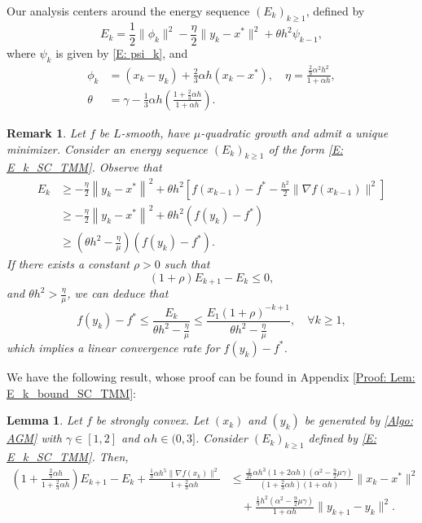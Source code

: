 \documentclass[pdflatex,sn-mathphys-num]{sn-jnl}
\theoremstyle{thmstyleone}
\newtheorem{lemma}[theorem]{Lemma}
\theoremstyle{thmstyletwo}
\newtheorem{remark}{Remark}
\theoremstyle{thmstylethree}
\begin{document}
Our analysis centers around the energy sequence $(E_k)_{k\ge 1}$, defined by
\begin{equation}\label{E: E_k_SC_TMM}
E_k = \frac{1}{2}\| \phi_k \|^2 - \frac{\eta}{2}\| y_k-x^* \|^2 + \theta h^2 \psi_{k-1},
\end{equation}
where $\psi_k$ is given by \eqref{E: psi_k}, and
\begin{align*}
\phi_k &= (x_k-y_k) + \frac{2}{3}\alpha h(x_k-x^*),
\quad \eta = \frac{\frac{2}{9}\alpha^2 h^2}{1 + \alpha h },\\
\theta &= \gamma  - \frac{1}{3}\alpha h\left( \frac{1 + \frac{2}{3}\alpha h}{1+\alpha h} \right).
\end{align*}

\begin{remark}\label{Rem: func_estimate_QG}
Let $f$ be $L$-smooth, have $\mu$-quadratic growth and admit a unique minimizer. Consider an energy sequence $(E_k)_{k\ge 1}$ of the form \eqref{E: E_k_SC_TMM}. Observe that
\begin{align*}
E_k &\ge - \frac{\eta}{2}\left\| y_k - x^* \right\|^2 + \theta h^2 \left[ f(x_{k-1}) - f^* - \frac{h^2}{2}\| \nabla f(x_{k-1}) \|^2 \right] \\
&\ge - \frac{\eta}{2}\left\| y_k - x^* \right\|^2 + \theta h^2 \left( f(y_k) - f^* \right)\\
&\ge \left( \theta h^2 - \frac{\eta}{\mu} \right) \left( f(y_k) - f^* \right).
\end{align*}
If there exists a constant $\rho > 0$ such that
\begin{equation}\nonumber
(1+\rho) E_{k+1} - E_k \le 0,
\end{equation}
and $\theta h^2 > \frac{\eta}{\mu}$, we can deduce that
\begin{equation}\nonumber
f(y_k) - f^* \le \frac{E_k}{\theta h^2 - \frac{\eta}{\mu}} \le \frac{E_1 (1+\rho)^{-k+1}}{\theta h^2 - \frac{\eta}{\mu} },\quad \forall k\ge 1,
\end{equation}
which implies a linear convergence rate for $f(y_k) - f^*$.
\end{remark}


We have the following result, whose proof can be found in Appendix \ref{Proof: Lem: E_k_bound_SC_TMM}:

\begin{lemma}\label{Lem: E_k_bound_SC_TMM}
Let $f$ be strongly convex. Let $(x_k)$ and $(y_k)$ be generated by \eqref{Algo: AGM} with $\gamma\in[1, 2]$ and $\alpha h\in(0,3]$. Consider $(E_k)_{k\ge 1}$ defined by \eqref{E: E_k_SC_TMM}. Then, 
\begin{align*}
\left( 1 + \frac{\frac{2}{3}\alpha h}{1 + \frac{2}{3}\alpha h} \right) E_{k+1} - E_k
  + \frac{ \frac{1}{3}\alpha h^5 \| \nabla f(x_k) \|^2 }{ 1 + \frac{2}{3}\alpha h }
&\le \frac{\frac{2}{27}\alpha h^3 (1+2\alpha h) \left(\alpha^2 - \frac{9}{2}\mu\gamma \right)}{\left( 1+\frac{2}{3}\alpha h \right)(1+\alpha h)}\| x_k - x^* \|^2 \\[2pt]
&\quad + \frac{\frac{1}{9} h^2 \left( \alpha^2 - \frac{9}{2}\mu\gamma \right)}{1 + \alpha h } \| y_{k+1} - y_k \|^2. 
\end{align*}
\end{lemma}
\end{document}
